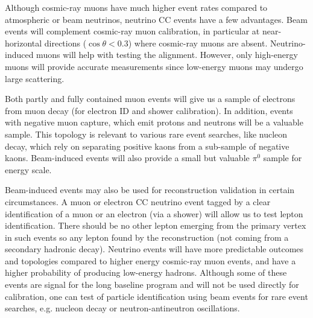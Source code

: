 
Although cosmic-ray muons have much higher event rates compared to atmospheric or beam neutrinos, neutrino CC events have a few advantages.  Beam events will complement cosmic-ray muon calibration, in particular at near-horizontal directions ($\cos\theta < 0.3$) where cosmic-ray muons are absent. Neutrino-induced muons will help with testing the  alignment.  However, only high-energy muons will provide accurate measurements since low-energy muons may undergo large scattering.

Both partly and fully contained muon events will give us a sample of electrons from muon decay (for electron ID and shower calibration). In addition, events with negative muon capture, which emit protons and neutrons will be a valuable sample. This topology is relevant to various rare event searches, like nucleon decay, which rely on separating positive kaons from a sub-sample of negative kaons. Beam-induced events will also provide a small but valuable $\pi^{0}$ sample for energy scale.

Beam-induced events may also be used for reconstruction validation in certain circumstances. A muon or electron CC neutrino event tagged by a clear identification of a muon or an electron (via a shower) will allow us to test lepton identification. There should be no other lepton emerging from the primary vertex in such events so any lepton found by the reconstruction (not coming from a secondary hadronic decay).  Neutrino events will have more predictable outcomes and topologies compared to higher energy cosmic-ray muon events, and have a higher probability of producing low-energy hadrons.  Although some of these events are signal for the long baseline program and will not be used directly for calibration, one can test of particle identification using beam events for rare event searches, e.g. nucleon decay or neutron-antineutron oscillations.



